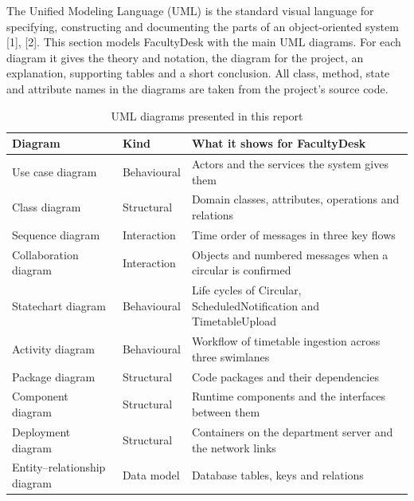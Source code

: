 \newcommand{\ucscenario}[7]{%
\needspace{7\baselineskip}
\begin{xltabular}{\textwidth}{|p{3.4cm}|Y|}
\caption{Use case scenario: #2}\\
\hline
\textbf{Use Case ID} & #1 \\ \hline
\textbf{Use Case Name} & #2 \\ \hline
\textbf{Actors} & #3 \\ \hline
\textbf{Precondition} & #4 \\ \hline
\textbf{Main Flow} & #5 \\ \hline
\textbf{Alternative Flow} & #6 \\ \hline
\textbf{Postcondition} & #7 \\ \hline
\end{xltabular}}


The Unified Modeling Language (UML) is the standard visual language for specifying, constructing and documenting the parts of an object-oriented system [1], [2]. This section models FacultyDesk with the main UML diagrams. For each diagram it gives the theory and notation, the diagram for the project, an explanation, supporting tables and a short conclusion. All class, method, state and attribute names in the diagrams are taken from the project's source code.

\begin{xltabular}{\textwidth}{|p{4.6cm}|p{3cm}|Y|}
\caption{UML diagrams presented in this report}\\
\hline
\textbf{Diagram} & \textbf{Kind} & \textbf{What it shows for FacultyDesk} \\ \hline
Use case diagram & Behavioural & Actors and the services the system gives them \\ \hline
Class diagram & Structural & Domain classes, attributes, operations and relations \\ \hline
Sequence diagram & Interaction & Time order of messages in three key flows \\ \hline
Collaboration diagram & Interaction & Objects and numbered messages when a circular is confirmed \\ \hline
Statechart diagram & Behavioural & Life cycles of Circular, ScheduledNotification and TimetableUpload \\ \hline
Activity diagram & Behavioural & Workflow of timetable ingestion across three swimlanes \\ \hline
Package diagram & Structural & Code packages and their dependencies \\ \hline
Component diagram & Structural & Runtime components and the interfaces between them \\ \hline
Deployment diagram & Structural & Containers on the department server and the network links \\ \hline
Entity--relationship diagram & Data model & Database tables, keys and relations \\ \hline
\end{xltabular}

